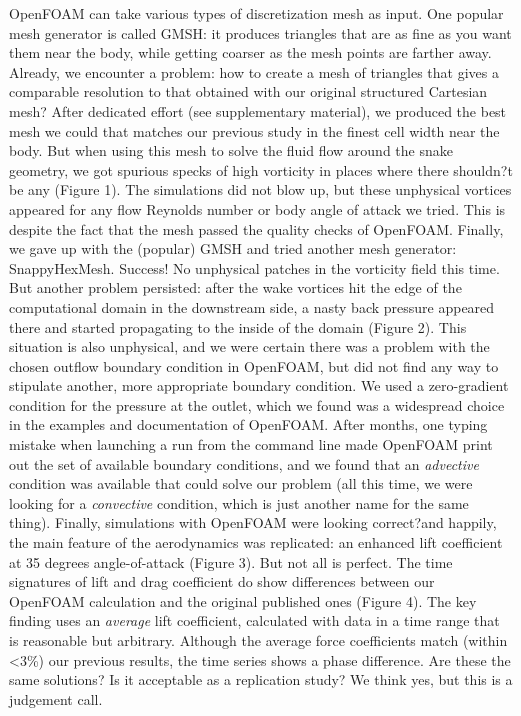 \documentclass[9pt,twocolumn,twoside]{article}
\newlength{\up}
\begin{document}
OpenFOAM can take various types of discretization mesh as input. 
One popular mesh generator is called GMSH: it produces triangles that are as fine as you want them near the body, while getting coarser as the mesh points are farther away. 
Already, we encounter a problem: how to create a mesh of triangles that gives a comparable resolution to that obtained with our original structured Cartesian mesh? 
After dedicated effort (see supplementary material), we produced the best mesh we could that matches our previous study in the finest cell width near the body. 
But when using this mesh to solve the fluid flow around the snake geometry, we got spurious specks of high vorticity in places where there shouldn?t be any (Figure 1). 
The simulations did not blow up, but these unphysical vortices appeared for any flow Reynolds number or body angle of attack we tried.
This is despite the fact that the mesh passed the quality checks of OpenFOAM. 
Finally, we gave up with the (popular) GMSH and tried another mesh generator: SnappyHexMesh. 
Success! 
No unphysical patches in the vorticity field this time. 
But another problem persisted: after the wake vortices hit the edge of the computational domain in the downstream side, a nasty back pressure appeared there and started propagating to the inside of the domain (Figure 2). 
This situation is also unphysical, and we were certain there was a problem with the chosen outflow boundary condition in OpenFOAM, but did not find any way to stipulate another, more appropriate boundary condition. 
We used a zero-gradient condition for the pressure at the outlet, which we found was a widespread choice in the examples and documentation of OpenFOAM. 
After months, one typing mistake when launching a run from the command line made OpenFOAM print out the set of available boundary conditions, and we found that an \textit{advective} condition was available that could solve our problem (all this time, we were looking for a \textit{convective} condition, which is just another name for the same thing). 
Finally, simulations with OpenFOAM were looking correct?and happily, the main feature of the aerodynamics was replicated: an enhanced lift coefficient at 35 degrees angle-of-attack (Figure 3). 
But not all is perfect. 
The time signatures of lift and drag coefficient do show differences between our OpenFOAM calculation and the original published ones (Figure 4). 
The key finding uses an \textit{average} lift coefficient, calculated with data in a time range that is reasonable but arbitrary. 
Although the average force coefficients match (within <3\%) our previous results, the time series shows a phase difference. 
Are these the same solutions? 
Is it acceptable as a replication study? 
We think yes, but this is a judgement call.
\end{document}
